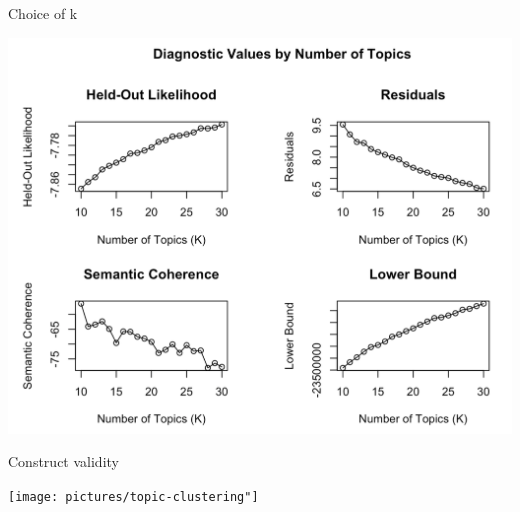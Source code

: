 \documentclass{hertieteaching}
\begin{document}
\begin{frame}{Choice of k}


\centerline{\includegraphics[scale=0.4]{pictures/heldout-lda}}

\end{frame}

\begin{frame}{Construct validity}

\centerline{\texttt{[image: pictures/topic-clustering"]}}

\end{frame}
\end{document}
